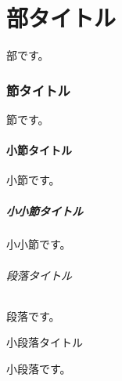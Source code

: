 \documentclass{ltjsarticle}
\begin{document}
\part{部タイトル}
部です。
\section{節タイトル}
節です。
\subsection{小節タイトル}
小節です。
\subsubsection{小小節タイトル}
小小節です。
\paragraph{段落タイトル}
段落です。
\subparagraph{小段落タイトル}
小段落です。
\end{document}
